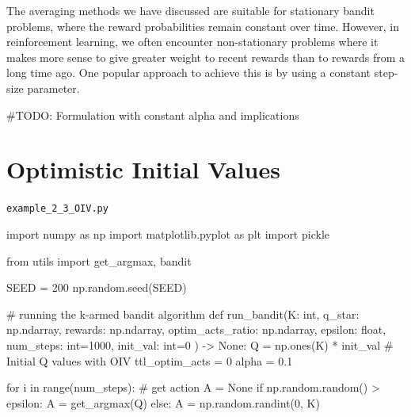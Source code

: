 \documentclass[
  letterpaper,
]{krantz}
\makeatletter
\newenvironment{Shaded}{\begin{snugshade}}{\end{snugshade}}
\newcommand{\BuiltInTok}[1]{\textcolor[rgb]{0.00,0.23,0.31}{#1}}
\newcommand{\CommentTok}[1]{\textcolor[rgb]{0.37,0.37,0.37}{#1}}
\newcommand{\ControlFlowTok}[1]{\textcolor[rgb]{0.00,0.23,0.31}{#1}}
\newcommand{\DecValTok}[1]{\textcolor[rgb]{0.68,0.00,0.00}{#1}}
\newcommand{\FloatTok}[1]{\textcolor[rgb]{0.68,0.00,0.00}{#1}}
\newcommand{\ImportTok}[1]{\textcolor[rgb]{0.00,0.46,0.62}{#1}}
\newcommand{\KeywordTok}[1]{\textcolor[rgb]{0.00,0.23,0.31}{#1}}
\newcommand{\NormalTok}[1]{\textcolor[rgb]{0.00,0.23,0.31}{#1}}
\newcommand{\OperatorTok}[1]{\textcolor[rgb]{0.37,0.37,0.37}{#1}}
\newcommand{\VariableTok}[1]{\textcolor[rgb]{0.07,0.07,0.07}{#1}}
\newenvironment{kframe}{%
\medskip{}
\setlength{\fboxsep}{.8em}
 \def\at@end@of@kframe{}%
 \ifinner\ifhmode%
  \def\at@end@of@kframe{\end{minipage}}%
  \begin{minipage}{\columnwidth}%
 \fi\fi%
 \def\FrameCommand##1{\hskip\@totalleftmargin \hskip-\fboxsep
 \colorbox{shadecolor}{##1}\hskip-\fboxsep
     \hskip-\linewidth \hskip-\@totalleftmargin \hskip\columnwidth}%
 \MakeFramed {\advance\hsize-\width
   \@totalleftmargin\z@ \linewidth\hsize
   \@setminipage}}%
 {\par\unskip\endMakeFramed%
 \at@end@of@kframe}
\renewenvironment{Shaded}{\begin{kframe}}{\end{kframe}}
\theoremstyle{plain}
\theoremstyle{definition}
\theoremstyle{definition}
\theoremstyle{remark}
\makeatother
\begin{document}
The averaging methods we have discussed are suitable for stationary
bandit problems, where the reward probabilities remain constant over
time. However, in reinforcement learning, we often encounter
non-stationary problems where it makes more sense to give greater weight
to recent rewards than to rewards from a long time ago. One popular
approach to achieve this is by using a constant step-size parameter.

\#TODO: Formulation with constant alpha and implications

\section{Optimistic Initial Values}\label{optimistic-initial-values}

\begin{codelisting}

\caption{\texttt{example\_2\_3\_OIV.py}}

\begin{Shaded}
\begin{Highlighting}[]
\ImportTok{import}\NormalTok{ numpy }\ImportTok{as}\NormalTok{ np}
\ImportTok{import}\NormalTok{ matplotlib.pyplot }\ImportTok{as}\NormalTok{ plt}
\ImportTok{import}\NormalTok{ pickle}

\ImportTok{from}\NormalTok{ utils }\ImportTok{import}\NormalTok{ get\_argmax, bandit}

\NormalTok{SEED }\OperatorTok{=} \DecValTok{200}
\NormalTok{np.random.seed(SEED)}


\CommentTok{\# running the k{-}armed bandit algorithm}
\KeywordTok{def}\NormalTok{ run\_bandit(K: }\BuiltInTok{int}\NormalTok{,}
\NormalTok{            q\_star: np.ndarray,}
\NormalTok{            rewards: np.ndarray,}
\NormalTok{            optim\_acts\_ratio: np.ndarray,}
\NormalTok{            epsilon: }\BuiltInTok{float}\NormalTok{,}
\NormalTok{            num\_steps: }\BuiltInTok{int}\OperatorTok{=}\DecValTok{1000}\NormalTok{,}
\NormalTok{            init\_val: }\BuiltInTok{int}\OperatorTok{=}\DecValTok{0}
\NormalTok{) }\OperatorTok{{-}\textgreater{}} \VariableTok{None}\NormalTok{:}
\NormalTok{    Q }\OperatorTok{=}\NormalTok{ np.ones(K) }\OperatorTok{*}\NormalTok{ init\_val   }\CommentTok{\# Initial Q values with OIV}
\NormalTok{    ttl\_optim\_acts }\OperatorTok{=} \DecValTok{0}
\NormalTok{    alpha }\OperatorTok{=} \FloatTok{0.1}

    \ControlFlowTok{for}\NormalTok{ i }\KeywordTok{in} \BuiltInTok{range}\NormalTok{(num\_steps):}
        \CommentTok{\# get action}
\NormalTok{        A }\OperatorTok{=} \VariableTok{None}
        \ControlFlowTok{if}\NormalTok{ np.random.random() }\OperatorTok{\textgreater{}}\NormalTok{ epsilon:}
\NormalTok{            A }\OperatorTok{=}\NormalTok{ get\_argmax(Q)}
        \ControlFlowTok{else}\NormalTok{:}
\NormalTok{            A }\OperatorTok{=}\NormalTok{ np.random.randint(}\DecValTok{0}\NormalTok{, K)}
        

\end{Highlighting}
\end{Shaded}
\end{codelisting}
\end{document}

